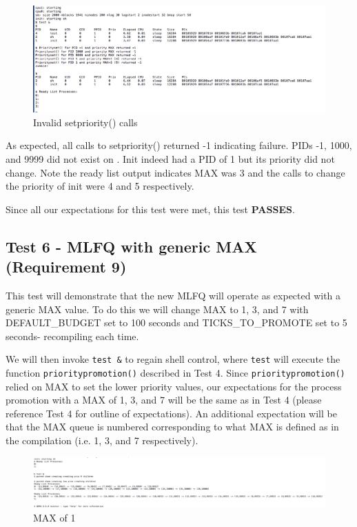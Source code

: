 \documentclass[11pt,letterpaper]{report}
\begin{document}
\begin{figure}[h]
\centering
\includegraphics[width=0.8\linewidth]{invalid-priority.png}
\caption{Invalid setpriority() calls}
\label{fig:5}
\end{figure}
 
 As expected, all calls to setpriority() returned -1 indicating failure. PIDs -1, 1000, and 9999 did not exist on . Init indeed had a PID of 1 but its priority did not change. Note the ready list output indicates MAX was 3 and the calls to change the priority of init were 4 and 5 respectively.
 
 Since all our expectations for this test were met, this test \textbf{PASSES}. 
 
\subsection*{Test 6 - MLFQ with generic MAX (Requirement 9) }
This test will demonstrate that the new MLFQ will operate as expected with a generic MAX value. To do this we will change MAX to 1, 3, and
7 with DEFAULT\_BUDGET set to 100 seconds and TICKS\_TO\_PROMOTE set to 5 seconds- recompiling each time. 

We will then invoke {\tt test \&} to regain shell control, where {\tt test} will execute the function {\tt prioritypromotion()} described in 
Test 4. Since {\tt prioritypromotion()} relied on MAX to set the lower priority values, our expectations for the process promotion with a MAX of 1, 3, and 7 will
be the same as in Test 4 (please reference Test 4 for outline of expectations). An additional expectation will be that the MAX queue is numbered corresponding to what MAX is defined as in the compilation (i.e. 1, 3, and 7 respectively).

\begin{figure}[h]
\centering
\includegraphics[width=1\linewidth]{max-1.png}
\caption{MAX of 1}
\label{fig:5}
\end{figure}
\end{document}
